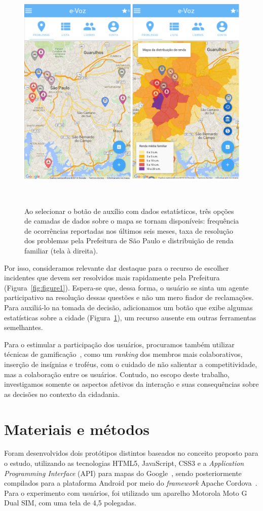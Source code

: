 \documentclass{sigchi}
\begin{document}
\begin{figure}
	\centering
	\includegraphics[width=0.9\columnwidth]{figures/prototipo2b}
	\caption{Ao selecionar o botão de auxílio com dados estatísticos, três opções de camadas de dados sobre o mapa se tornam disponíveis: frequência de ocorrências reportadas nos últimos seis meses, taxa de resolução dos problemas pela Prefeitura de São Paulo e distribuição de renda familiar (tela à direita).  }~\label{fig:figure2}
\end{figure}

Por isso, consideramos relevante dar destaque para o recurso de escolher incidentes que devem ser resolvidos mais rapidamente pela Prefeitura (Figura~\ref{fig:figure1}). Espera-se que, dessa forma, o usuário se sinta um agente participativo na resolução dessas questões e não um mero fiador de reclamações. Para auxiliá-lo na tomada de decisão, adicionamos um botão que exibe algumas estatísticas sobre a cidade (Figura~\ref{fig:figure2}), um recurso ausente em outras ferramentas semelhantes.


Para o estimular a participação dos usuários, procuramos também utilizar técnicas de gamificação~\cite{deterding:2011}, como um \textit{ranking} dos membros mais colaborativos, inserção de insígnias e troféus, com o cuidado de não salientar a competitividade, mas a colaboração entre os usuários. Contudo, no escopo deste trabalho, investigamos somente os aspectos afetivos da interação e suas consequências sobre as decisões no contexto da cidadania.


\section{Materiais e métodos}
Foram desenvolvidos dois protótipos distintos baseados no conceito proposto para o estudo, utilizando as tecnologias HTML5, JavaScript, CSS3 e a \textit{Application Programming Interface} (API) para mapas do Google~\cite{googlemaps:2016}, sendo posteriormente compilados para a plataforma Android por meio do \textit{framework} Apache Cordova~\cite{cordova:2016}. Para o experimento com usuários, foi utilizado um aparelho Motorola Moto G Dual SIM, com uma tela de 4,5 polegadas.
\end{document}
